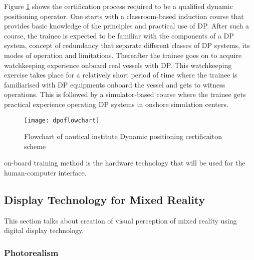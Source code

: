 Figure \ref{fig:dpoflowchart} shows the certification process required to be a qualified dynamic positioning operator. One starts with a classroom-based induction course that provides basic knowledge of the principles and practical use of DP. After such a course, the trainee is expected to be familiar with the components of a DP system, concept of redundancy that separate different classes of DP systems, its modes of operation and limitations. Thereafter the trainee goes on to acquire watchkeeping experience onboard real vessels with DP. This watchkeeping exercise takes place for a relatively short period of time where the trainee is familiarised with DP equipments onboard the vessel and gets to witness operations. This is followed by a simulator-based course where the trainee gets practical experience operating DP systems in onshore simulation centers.  

\begin{figure}
	\centering
	\texttt{[image: dpoflowchart]}
	\caption{Flowchart of nautical institute Dynamic positioning certificaiton scheme}
	\label{fig:dpoflowchart}
\end{figure}



on-board training method is the hardware technology that will be used for the human-computer interface.

\subsection{Display Technology for Mixed Reality}

This section talks about creation of visual perception of mixed reality using digital display technology. 
\subsubsection{Photorealism}


